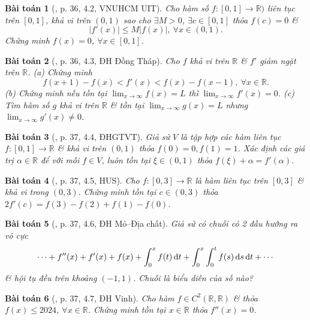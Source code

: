 \documentclass{article}
\newtheorem{baitoan}{Bài toán}
\begin{document}
\begin{baitoan}[\cite{VMS_VMC2024}, p. 36, 4.2, VNUHCM UIT]
	Cho hàm số $f:[0,1]\to\mathbb{R})$ liên tục trên $[0,1]$, khả vi trên $(0,1)$ sao cho $\exists M > 0$, $\exists c\in[0,1]$ thỏa $f(c) = 0$ \&
	\begin{equation*}
		|f'(x)|\le M|f(x)|,\ \forall x\in(0,1).
	\end{equation*}
	Chứng minh $f(x) = 0$, $\forall x\in[0,1]$.
\end{baitoan}

\begin{baitoan}[\cite{VMS_VMC2024}, p. 36, 4.3, ĐH Đồng Tháp]
	Cho $f$ khả vi trên $\mathbb{R}$ \& $f'$ giảm ngặt trên $\mathbb{R}$. (a) Chứng minh
	\begin{equation*}
		f(x + 1) - f(x) < f'(x) < f(x) - f(x - 1),\ \forall x\in\mathbb{R}.
	\end{equation*}
	(b) Chứng minh nếu tồn tại $\lim_{x\to\infty} f(x) = L$ thì $\lim_{x\to\infty} f'(x) = 0$. (c) Tìm hàm số $g$ khả vi trên $\mathbb{R}$ \& tồn tại $\lim_{x\to\infty} g(x) = L$ nhưng $\lim_{x\to\infty} g'(x)\ne0$.
\end{baitoan}

\begin{baitoan}[\cite{VMS_VMC2024}, p. 37, 4.4, ĐHGTVT]
	Giả sử $V$ là tập hợp các hàm liên tục $f:[0,1]\to\mathbb{R}$ \& khả vi trên $(0,1)$ thỏa $f(0) = 0,f(1) = 1$. Xác định các giá trị $\alpha\in\mathbb{R}$ để với mỗi $f\in V$, luôn tồn tại $\xi\in(0,1)$ thỏa $f(\xi) + \alpha = f'(\alpha)$.
\end{baitoan}

\begin{baitoan}[\cite{VMS_VMC2024}, p. 37, 4.5, HUS]
	Cho $f:[0,3]\to\mathbb{R}$ là hàm liên tục trên $[0,3]$ \& khả vi trong $(0,3)$. Chứng minh tồn tại $c\in(0,3)$ thỏa $2f'(c) = f(3) - f(2) + f(1) - f(0)$.
\end{baitoan}

\begin{baitoan}[\cite{VMS_VMC2024}, p. 37, 4.6, ĐH Mỏ--Địa chất]
	Giả sử có chuỗi có 2 đầu hướng ra vô cực
	\begin{equation*}
		\cdots + f''(x) + f'(x) + f(x) + \int_0^x f(t)\,{\rm d}t + \int_0^x\int_0^t f(s)\,{\rm d}s\,{\rm d}t + \cdots
	\end{equation*}
	\& hội tụ đều trên khoảng $(-1,1)$. Chuỗi là biểu diễn của số nào?
\end{baitoan}

\begin{baitoan}[\cite{VMS_VMC2024}, p. 37, 4.7, ĐH Vinh]
	Cho hàm $f\in C^2(\mathbb{R},\mathbb{R})$ \& thỏa $f(x)\le2024$, $\forall x\in\mathbb{R}$. Chứng minh tồn tại $x\in\mathbb{R}$ thỏa $f''(x) = 0$.
\end{baitoan}
\end{document}
